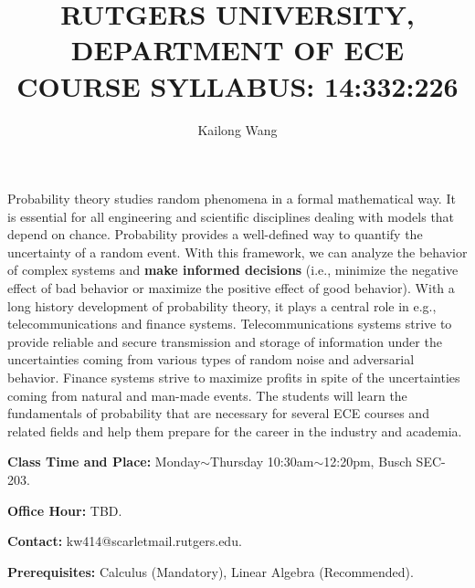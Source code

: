 \documentclass{article}
\title{RUTGERS UNIVERSITY, DEPARTMENT OF ECE \\
COURSE SYLLABUS: 14:332:226}
\author{Kailong Wang}
\date{}
\theoremstyle{definition}
\theoremstyle{remark}
\begin{document}
\maketitle
Probability theory studies random phenomena in a formal mathematical way. It is essential for all engineering and scientific disciplines dealing with models that depend on chance.
Probability provides a well-defined way to quantify the uncertainty of a random event. With this framework, we can analyze the behavior of complex systems and \textbf{make informed decisions} (i.e., minimize the negative effect of bad behavior or maximize the positive effect of good behavior).
With a long history development of probability theory, it plays a central role in e.g.,  telecommunications and finance systems. Telecommunications systems strive to provide reliable and secure transmission and storage of information under the uncertainties coming from various types of random noise and adversarial behavior. Finance systems strive to maximize profits in spite of the uncertainties coming from natural and man-made events.
The students will learn the fundamentals of probability that are necessary for several ECE courses and related fields and help them prepare for the career in the industry and academia.

\textbf{Class Time and Place:} Monday$\sim$Thursday 10:30am$\sim$12:20pm, Busch SEC-203.

\textbf{Office Hour:} TBD.

\textbf{Contact:} kw414@scarletmail.rutgers.edu.

\textbf{Prerequisites:} Calculus (Mandatory), Linear Algebra (Recommended).
\end{document}
